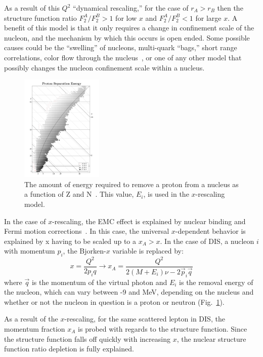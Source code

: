 As a result of this $Q^2$ ``dynamical rescaling,'' for the case of $r_A>r_B$ then the structure function ratio $F_2^A/F_2^B>1$ for low $x$ and $F_2^A/F_2^B<1$ for large $x$. A benefit of this model is that it only requires a change in confinement scale of the nucleon, and the mechanism by which this occurs is open ended. Some possible causes could be the ``swelling'' of nucleons, multi-quark ``bags,'' short range correlations, color flow through the nucleus~\cite{Rith:2014tma}, or one of any other model that possibly changes the nucleon confinement scale within a nucleus.

\begin{figure}
	\centering
	\includegraphics[width=0.35\textwidth]{figures/background/removal-energy.pdf}
	\caption{The amount of energy required to remove a proton from a nucleus as a function of Z and N~\cite{Dommelen}. This value, $E_i$, is used in the $x$-rescaling model.}
	\label{fig:nucleon-removal}
\end{figure}
In the case of $x$-rescaling, the EMC effect is explained by nuclear binding and Fermi motion corrections~\cite{GarciaCanal:1984eh, Staszel:1983qx}. In this case, the universal $x$-dependent behavior is explained by x having to be scaled up to a $x_A>x$. In the case of DIS, a nucleon $i$ with momentum $p_i$, the Bjorken-$x$ variable is replaced by:
\begin{equation}
x = \frac{Q^2}{2 p_i q} \rightarrow x_A = \frac{Q^2}{2(M+E_i)\nu - 2 \vec{p}_i \vec{q}}
\end{equation} 
where $\vec{q}$ is the momentum of the virtual photon and $E_i$ is the removal energy of the nucleon, which can vary between -9 and \unit[-27]{MeV}, depending on the nucleus and whether or not the nucleon in question is a proton or neutron (Fig.~\ref{fig:nucleon-removal}).

As a result of the $x$-rescaling, for the same scattered lepton in DIS, the momentum fraction $x_A$ is probed with regards to the structure function. Since the structure function falls off quickly with increasing $x$, the nuclear structure function ratio depletion is fully explained.

